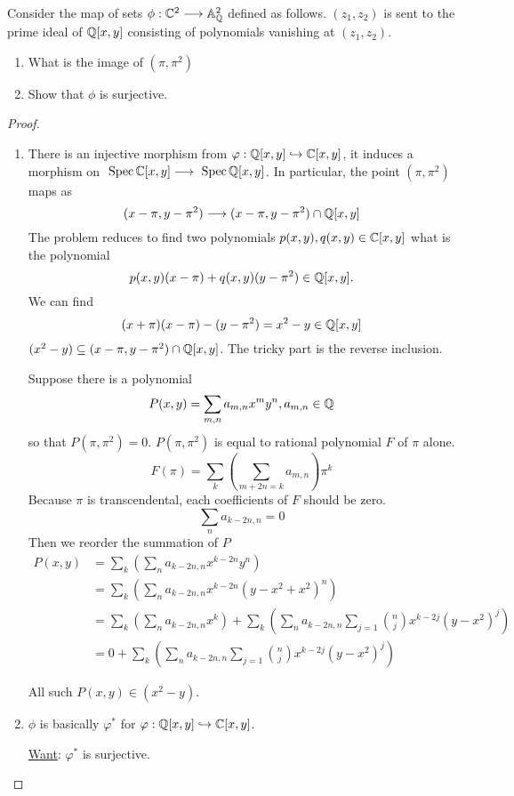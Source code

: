 \begin{exr}
Consider the map of sets $\phi: \mathbb C^2\longrightarrow \mathbb{A}_\mathbb Q^{2}$ defined as follows. $(z_1,z_2)$ is sent to the prime ideal of $\mathbb Q[x,y]$ consisting of polynomials vanishing at $(z_1,z_2)$.
\begin{enumerate}[label=(\alph*)]
\item What is the image of $(\pi,\pi^2)$
\item Show that $\phi$ is surjective.
\end{enumerate}
\end{exr}
\begin{proof}
\begin{enumerate}[label=(\alph*)]
\item 
There is an injective morphism from $\varphi:\mathbb Q[x,y]\hookrightarrow \mathbb C[x,y]$, it induces a morphism on $\text{ Spec\,} \mathbb C[x,y]\longrightarrow \text{ Spec\,} \mathbb Q[x,y]$. In particular, the point $(\pi,\pi^2)$ maps as 
$$
(x-\pi,y-\pi^2)\longrightarrow (x-\pi,y-\pi^2)\cap \mathbb Q[x,y]
$$
The problem reduces to find two polynomials $p(x,y),q(x,y)\in\mathbb C[x,y]$ what is the polynomial
$$
p(x,y)(x-\pi)+q(x,y)(y-\pi^2)\in \mathbb Q[x,y].
$$
We can find 
$$
(x+\pi)(x-\pi)-(y-\pi^2)=x^2-y\in \mathbb Q[x,y]
$$
$(x^2-y)\subseteq (x-\pi,y-\pi^2)\cap\mathbb Q[x,y]$. The tricky part is the reverse inclusion. 

Suppose there is a polynomial 
$$
P(x,y)=\sum_{m,n}a_{m,n}x^{m}y^{n}, a_{m,n}\in \mathbb Q
$$
so that $P(\pi,\pi^2)=0$. $P(\pi,\pi^2)$ is equal to rational polynomial $F$ of $\pi$ alone. 
$$
F(\pi)=\sum_k(\sum_{m+2n=k} a_{m,n})\pi^{k} 
$$
Because $\pi$ is transcendental, each coefficients of $F$ should be zero.
$$
\sum_n a_{k-2n,n}=0
$$
 Then we reorder the summation of $P$
$$
\begin{aligned}
P(x,y)&=\sum_{k}\left(\sum_{n}a_{k-2n,n}x^{k-2n}y^{n}\right)\\
&=\sum_{k}\left(\sum_{n}a_{k-2n,n}x^{k-2n}(y-x^2+x^2)^{n}\right)\\
&=\sum_{k}\left(\sum_{n}a_{k-2n,n}x^{k}\right)+\sum_{k}\left(\sum_{n}a_{k-2n,n}\sum_{j=1}\binom{n}{j} x^{k-2j}(y-x^2)^{j}\right)\\
&=0+\sum_{k}\left(\sum_{n}a_{k-2n,n}\sum_{j=1}\binom{n}{j} x^{k-2j}(y-x^2)^{j}\right)
\end{aligned}
$$

All such $P(x,y)\in (x^2-y)$.

\item $\phi$ is basically $\varphi^*$ for $\varphi:\mathbb Q[x,y]\hookrightarrow \mathbb C[x,y]$. 

\underline{Want}: $\varphi^*$ is surjective.


\end{enumerate}
\end{proof}

